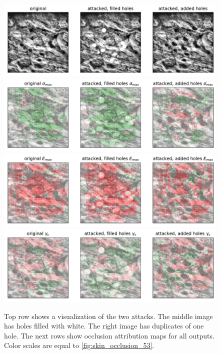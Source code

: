 \begin{figure}
    \centering
    \includegraphics[width=\linewidth]{skinstression/images/attack/attack-viz.pdf} \\
    \includegraphics[width=\linewidth]{skinstression/images/attack/holes-occlusion-0.pdf} \\
    \includegraphics[width=\linewidth]{skinstression/images/attack/holes-occlusion-1.pdf} \\
    \includegraphics[width=\linewidth]{skinstression/images/attack/holes-occlusion-2.pdf}
    \caption[Occlusion on attacked image]{
        Top row shows a visualization of the two attacks.
        The middle image has holes filled with white.
        The right image has duplicates of one hole.
        The next rows show occlusion attribution maps for all outputs.
        Color scales are equal to \cref{fig:skin_occlusion_53}.
    }
    \label{fig:attack_occlusion}
\end{figure}

